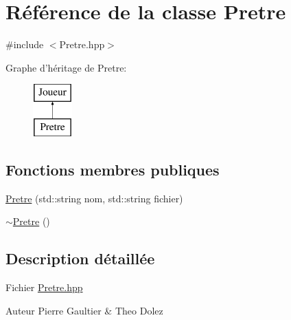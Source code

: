 \hypertarget{class_pretre}{\section{\-Référence de la classe \-Pretre}
\label{class_pretre}
}


{\ttfamily \#include $<$\-Pretre.\-hpp$>$}

\-Graphe d'héritage de \-Pretre\-:\begin{figure}[H]
\begin{center}
\leavevmode
\includegraphics[height=2.000000cm]{class_pretre}
\end{center}
\end{figure}
\subsection*{\-Fonctions membres publiques}
\begin{DoxyCompactItemize}
\item 
\hyperlink{class_pretre_a05462a17df09bcc3c84cebdcb994b9a5}{\-Pretre} (std\-::string nom, std\-::string fichier)
\item 
\hyperlink{class_pretre_a9235b9c5f1c57e7d6bb8cba648c43414}{$\sim$\-Pretre} ()
\end{DoxyCompactItemize}


\subsection{\-Description détaillée}
\-Fichier \hyperlink{_pretre_8hpp}{\-Pretre.\-hpp} \begin{DoxyAuthor}{\-Auteur}
\-Pierre \-Gaultier \& \-Theo \-Dolez 
\end{DoxyAuthor}


